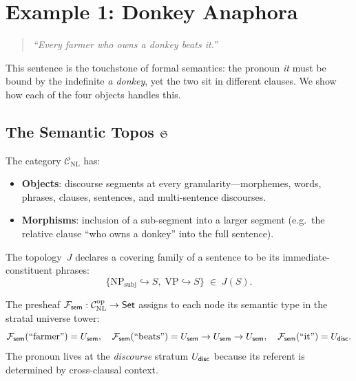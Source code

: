 \section{Example 1: Donkey Anaphora}
\label{sec:donkey}

\begin{quote}
\emph{``Every farmer who owns a donkey beats it.''}
\end{quote}

This sentence is the touchstone of formal semantics: the pronoun
\emph{it} must be bound by the indefinite \emph{a donkey}, yet
the two sit in different clauses.  We show how each of the four
objects handles this.

\subsection{The Semantic Topos $\mathfrak{S}$}

\begin{construction}[NL site]
\label{con:nl-site}
The category $\mathcal{C}_{\mathrm{NL}}$ has:
\begin{itemize}[nosep]
  \item \textbf{Objects}: discourse segments at every granularity---morphemes,
    words, phrases, clauses, sentences, and multi-sentence discourses.
  \item \textbf{Morphisms}: inclusion of a sub-segment into a
    larger segment (e.g.\ the relative clause ``who owns a donkey''
    into the full sentence).
\end{itemize}
The topology~$J$ declares a covering family of a sentence to
be its immediate-constituent phrases:
\[
  \bigl\{\text{NP}_{\text{subj}}\hookrightarrow S,\;
         \text{VP}\hookrightarrow S\bigr\}
  \;\in\;J(S).
\]
\end{construction}

\begin{definition}
The presheaf $\mathcal{F}_{\mathsf{sem}}:\mathcal{C}_{\mathrm{NL}}^{\mathrm{op}}\to\mathsf{Set}$
assigns to each node its semantic type in the stratal universe tower:
\[
  \mathcal{F}_{\mathsf{sem}}(\text{``farmer''}) = U_{\mathsf{sem}},\quad
  \mathcal{F}_{\mathsf{sem}}(\text{``beats''}) = U_{\mathsf{sem}}\to U_{\mathsf{sem}}\to U_{\mathsf{sem}},\quad
  \mathcal{F}_{\mathsf{sem}}(\text{``it''}) = U_{\mathsf{disc}}.
\]
The pronoun lives at the \emph{discourse} stratum $U_{\mathsf{disc}}$
because its referent is determined by cross-clausal context.
\end{definition}

